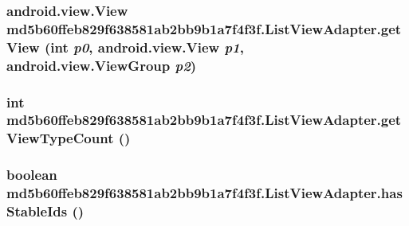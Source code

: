 \hypertarget{classmd5b60ffeb829f638581ab2bb9b1a7f4f3f_1_1_list_view_adapter_e2fe00b727ac49a6127f035217453806}{
\subsubsection[{getView}]{\setlength{\rightskip}{0pt plus 5cm}android.view.View md5b60ffeb829f638581ab2bb9b1a7f4f3f.ListViewAdapter.getView (int {\em p0}, \/  android.view.View {\em p1}, \/  android.view.ViewGroup {\em p2})}}
\label{classmd5b60ffeb829f638581ab2bb9b1a7f4f3f_1_1_list_view_adapter_e2fe00b727ac49a6127f035217453806}


\hypertarget{classmd5b60ffeb829f638581ab2bb9b1a7f4f3f_1_1_list_view_adapter_d3f6189cd42d626e244ac54ad5afdc10}{
\subsubsection[{getViewTypeCount}]{\setlength{\rightskip}{0pt plus 5cm}int md5b60ffeb829f638581ab2bb9b1a7f4f3f.ListViewAdapter.getViewTypeCount ()}}
\label{classmd5b60ffeb829f638581ab2bb9b1a7f4f3f_1_1_list_view_adapter_d3f6189cd42d626e244ac54ad5afdc10}


\hypertarget{classmd5b60ffeb829f638581ab2bb9b1a7f4f3f_1_1_list_view_adapter_f602626fd68dbd7b7b5f21f077d0a303}{
\subsubsection[{hasStableIds}]{\setlength{\rightskip}{0pt plus 5cm}boolean md5b60ffeb829f638581ab2bb9b1a7f4f3f.ListViewAdapter.hasStableIds ()}}
\label{classmd5b60ffeb829f638581ab2bb9b1a7f4f3f_1_1_list_view_adapter_f602626fd68dbd7b7b5f21f077d0a303}


